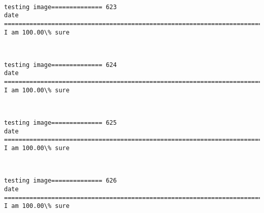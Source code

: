 \documentclass[11pt]{article}
\begin{document}
    \begin{center}
    \end{center}
    { \hspace*{\fill} \\}
    
    \begin{Verbatim}[commandchars=\\\{\}]
testing image============== 623
date
============================================================================
I am 100.00\% sure

    \end{Verbatim}

    \begin{center}
    \end{center}
    { \hspace*{\fill} \\}
    
    \begin{Verbatim}[commandchars=\\\{\}]
testing image============== 624
date
============================================================================
I am 100.00\% sure

    \end{Verbatim}

    \begin{center}
    \end{center}
    { \hspace*{\fill} \\}
    
    \begin{Verbatim}[commandchars=\\\{\}]
testing image============== 625
date
============================================================================
I am 100.00\% sure

    \end{Verbatim}

    \begin{center}
    \end{center}
    { \hspace*{\fill} \\}
    
    \begin{Verbatim}[commandchars=\\\{\}]
testing image============== 626
date
============================================================================
I am 100.00\% sure

    \end{Verbatim}
\end{document}
